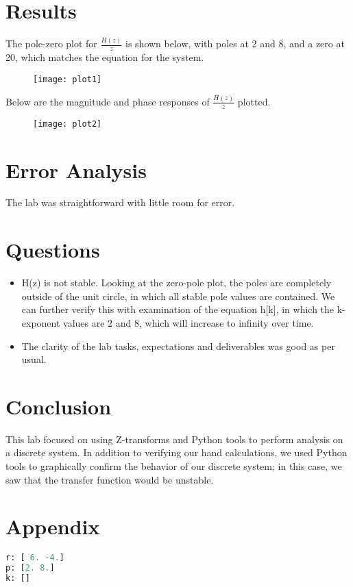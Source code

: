 \documentclass[11pt,a4,titlepage]{article}
\begin{document}
\section{Results}
The pole-zero plot for $\frac{H(z)}{z}$ is shown below, with poles at 2 and 8, and a zero at 20, which matches the equation for the system.
\begin{figure}[H]
	\centering
	\texttt{[image: plot1]}
\end{figure}

Below are the magnitude and phase responses of $\frac{H(z)}{z}$ plotted.

\begin{figure}[H]
	\centering
	\texttt{[image: plot2]}
\end{figure}

\section{Error Analysis}
The lab was straightforward with little room for error.

\section{Questions}
\begin{itemize}
	\item H(z) is not stable. Looking at the zero-pole plot, the poles are completely outside of the unit circle, in which all stable pole values are contained. We can further verify this with examination of the equation h[k], in which the k-exponent values are 2 and 8, which will increase to infinity over time.
	\item The clarity of the lab tasks, expectations and deliverables was good as per usual.
\end{itemize}

\section{Conclusion}
This lab focused on using Z-transforms and Python tools to perform analysis on a discrete system. In addition to verifying our hand calculations, we used Python tools to graphically confirm the behavior of our discrete system; in this case, we saw that the transfer function would be unstable.

\section{Appendix}
\begin{lstlisting}[language=Python]
 r: [ 6. -4.]
p: [2. 8.]
k: []
\end{lstlisting}
\end{document}
